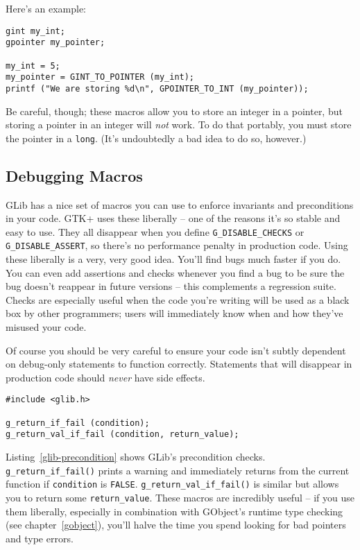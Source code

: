 Here's an example:
\begin{lstlisting}
gint my_int;
gpointer my_pointer;

my_int = 5;
my_pointer = GINT_TO_POINTER (my_int);
printf ("We are storing %d\n", GPOINTER_TO_INT (my_pointer));
\end{lstlisting}

Be careful, though; these macros allow you to store an integer in a pointer, but storing a pointer in an integer will \emph{not} work. To do that portably, you must store the pointer in a \lstinline{long}. (It's undoubtedly a bad idea to do so, however.)

\subsection{Debugging Macros}

GLib has a nice set of macros you can use to enforce invariants and preconditions in your code. GTK+ uses these liberally -- one of the reasons it's so stable and easy to use. They all disappear when you define \lstinline{G_DISABLE_CHECKS} or \lstinline{G_DISABLE_ASSERT}, so there's no performance penalty in production code. Using these liberally is a very, very good idea. You'll find bugs much faster if you do. You can even add assertions and checks whenever you find a bug to be sure the bug doesn't reappear in future versions -- this complements a regression suite. Checks are especially useful when the code you're writing will be used as a black box by other programmers; users will immediately know when and how they've misused your code.

Of course you should be very careful to ensure your code isn't subtly dependent on debug-only statements to function correctly. Statements that will disappear in production code should \emph{never} have side effects.

\begin{lstlisting}[float, caption={Precondition Checks}, label=glib-precondition]
#include <glib.h>

g_return_if_fail (condition);
g_return_val_if_fail (condition, return_value);
\end{lstlisting}

Listing~\ref{glib-precondition} shows GLib's precondition checks. \lstinline{g_return_if_fail()} prints a warning and immediately returns from the current function if \lstinline{condition} is \lstinline{FALSE}. \lstinline{g_return_val_if_fail()} is similar but allows you to return some \lstinline{return_value}. These macros are incredibly useful -- if you use them liberally, especially in combination with GObject's runtime type checking (see chapter~\ref{gobject}), you'll halve the time you spend looking for bad pointers and type errors.

